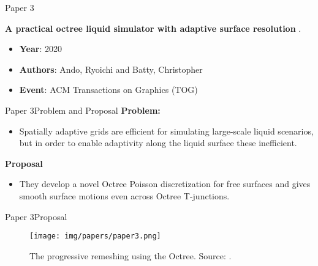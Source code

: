 \documentclass[10pt]{beamer}
\newcommand{\1}{
        	\setbeamertemplate{background}{
        		\texttt{[image: img/1]}
        		\tikz[overlay] \fill[fill opacity=0.75,fill=white] (0,0) rectangle (-\paperwidth,\paperheight);
        	}
}
\begin{document}
\begin{frame}{Paper 3}{}
	
	\begin{block}{}
		\centering
		\textbf{A practical octree liquid simulator with adaptive surface resolution} \cite{ando2020practical}.
	\end{block}
	
	\begin{itemize}
		\item \textbf{Year}: 2020
		\item \textbf{Authors}: Ando, Ryoichi and Batty, Christopher
		\item \textbf{Event}: ACM Transactions on Graphics (TOG)
	\end{itemize}
\end{frame}


\begin{frame}{Paper 3}{Problem and Proposal}
	\textbf{Problem:}
	\begin{itemize}
		\item Spatially adaptive grids are efficient for simulating large-scale
		liquid scenarios, but in order to enable adaptivity along the liquid surface
		these inefficient.
	\end{itemize}
	
	\textbf{Proposal}
	\begin{itemize}
		\item They develop a novel Octree Poisson discretization for free surfaces and gives smooth surface motions even across Octree	T-junctions.
	\end{itemize}	
	
\end{frame}

\begin{frame}{Paper 3}{Proposal}
	\begin{figure}
		\centering
		\texttt{[image: img/papers/paper3.png]}
		\caption{The progressive remeshing using the Octree. Source: \cite{ando2020practical}.}
	\end{figure}
\end{frame}
\end{document}
